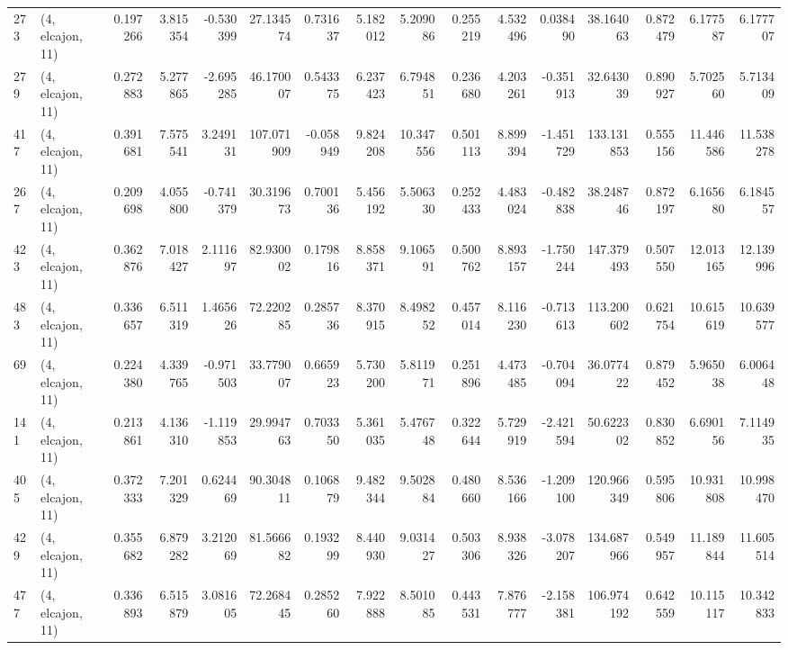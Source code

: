 \begin{tabular}{llrrrrrrrrrrrrrr}
273 &  (4, elcajon, 11) &   0.197266 &   3.815354 &  -0.530399 &    27.134574 &   0.731637 &   5.182012 &   5.209086 &  0.255219 &   4.532496 &   0.038490 &    38.164063 &  0.872479 &   6.177587 &   6.177707 \\
279 &  (4, elcajon, 11) &   0.272883 &   5.277865 &  -2.695285 &    46.170007 &   0.543375 &   6.237423 &   6.794851 &  0.236680 &   4.203261 &  -0.351913 &    32.643039 &  0.890927 &   5.702560 &   5.713409 \\
417 &  (4, elcajon, 11) &   0.391681 &   7.575541 &   3.249131 &   107.071909 &  -0.058949 &   9.824208 &  10.347556 &  0.501113 &   8.899394 &  -1.451729 &   133.131853 &  0.555156 &  11.446586 &  11.538278 \\
267 &  (4, elcajon, 11) &   0.209698 &   4.055800 &  -0.741379 &    30.319673 &   0.700136 &   5.456192 &   5.506330 &  0.252433 &   4.483024 &  -0.482838 &    38.248746 &  0.872197 &   6.165680 &   6.184557 \\
423 &  (4, elcajon, 11) &   0.362876 &   7.018427 &   2.111697 &    82.930002 &   0.179816 &   8.858371 &   9.106591 &  0.500762 &   8.893157 &  -1.750244 &   147.379493 &  0.507550 &  12.013165 &  12.139996 \\
483 &  (4, elcajon, 11) &   0.336657 &   6.511319 &   1.465626 &    72.220285 &   0.285736 &   8.370915 &   8.498252 &  0.457014 &   8.116230 &  -0.713613 &   113.200602 &  0.621754 &  10.615619 &  10.639577 \\
69  &  (4, elcajon, 11) &   0.224380 &   4.339765 &  -0.971503 &    33.779007 &   0.665923 &   5.730200 &   5.811971 &  0.251896 &   4.473485 &  -0.704094 &    36.077422 &  0.879452 &   5.965038 &   6.006448 \\
141 &  (4, elcajon, 11) &   0.213861 &   4.136310 &  -1.119853 &    29.994763 &   0.703350 &   5.361035 &   5.476748 &  0.322644 &   5.729919 &  -2.421594 &    50.622302 &  0.830852 &   6.690156 &   7.114935 \\
405 &  (4, elcajon, 11) &   0.372333 &   7.201329 &   0.624469 &    90.304811 &   0.106879 &   9.482344 &   9.502884 &  0.480660 &   8.536166 &  -1.209100 &   120.966349 &  0.595806 &  10.931808 &  10.998470 \\
429 &  (4, elcajon, 11) &   0.355682 &   6.879282 &   3.212069 &    81.566682 &   0.193299 &   8.440930 &   9.031427 &  0.503306 &   8.938326 &  -3.078207 &   134.687966 &  0.549957 &  11.189844 &  11.605514 \\
477 &  (4, elcajon, 11) &   0.336893 &   6.515879 &   3.081605 &    72.268445 &   0.285260 &   7.922888 &   8.501085 &  0.443531 &   7.876777 &  -2.158381 &   106.974192 &  0.642559 &  10.115117 &  10.342833 \\

\end{tabular}
